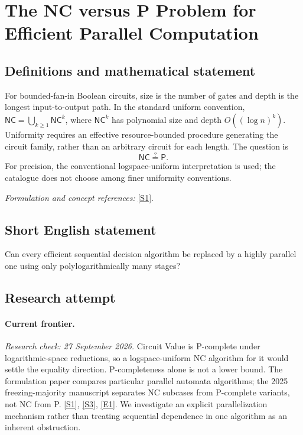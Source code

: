 \documentclass[11pt,a4paper]{article}
\newcommand{\sref}[2]{\hyperlink{source:#1:#2}{[S#2]}}
\newcommand{\eref}[2]{\hyperlink{extra:#1:#2}{[E#2]}}
\newif\ifshowcatalogue
\newcommand{\cataloguescope}[1]{\ifshowcatalogue
 \paragraph{Exact scope in the supplied catalogue.}
 \begin{quote}\small #1\end{quote}\fi}
\begin{document}
\setcounter{section}{0}
\clearpage
\section*{\texorpdfstring{The NC versus P Problem for Efficient Parallel Computation}{The NC versus P Problem for Efficient Parallel Computation}}\label{statement}
\subsection{Definitions and mathematical statement}
For bounded-fan-in Boolean circuits, size is the number of gates and depth is the longest input-to-output path. In the standard uniform convention, $\mathsf{NC}=\bigcup_{k\ge1}\mathsf{NC}^k$, where $\mathsf{NC}^k$ has polynomial size and depth $O((\log n)^k)$. Uniformity requires an effective resource-bounded procedure generating the circuit family, rather than an arbitrary circuit for each length. The question is
\[
 \mathsf{NC}\stackrel{?}{=}\mathsf P.
\]
For precision, the conventional logspace-uniform interpretation is used; the catalogue does not choose among finer uniformity conventions.
\par\smallskip\textit{Formulation and concept references:} \sref{statement}{1}.
\cataloguescope{Determine whether NC equals P, where NC consists of decision problems solvable by uniform polynomial-size circuit families of polylogarithmic depth and P consists of decision problems solvable in deterministic polynomial time.}
\subsection{Short English statement}
Can every efficient sequential decision algorithm be replaced by a highly parallel one using only polylogarithmically many stages?
\subsection{Research attempt}
\paragraph{Current frontier.}
\textit{Research check: 27 September 2026.}
Circuit Value is P-complete under logarithmic-space reductions, so a
logspace-uniform NC algorithm for it would settle the equality direction.
P-completeness alone is not a lower bound. The formulation paper compares
particular parallel automata algorithms; the 2025 freezing-majority
manuscript separates NC subcases from P-complete variants, not NC from P.
\sref{statement}{1}, \sref{statement}{3}, \eref{statement}{1}.
We investigate an explicit parallelization mechanism rather than treating
sequential dependence in one algorithm as an inherent obstruction.
\end{document}
